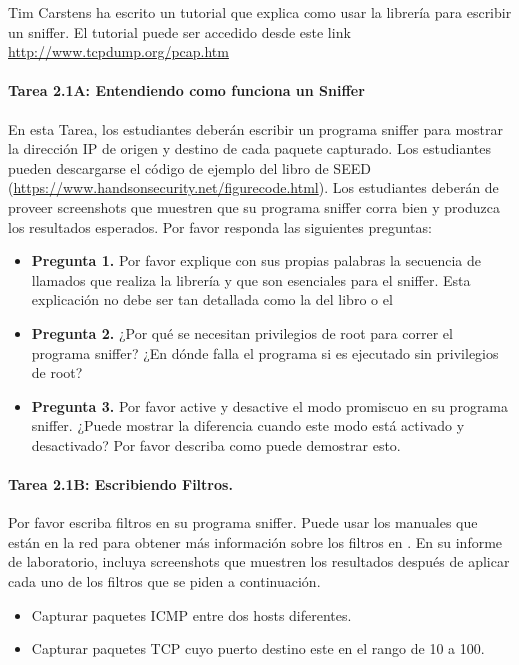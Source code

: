 Tim Carstens ha escrito un tutorial que explica como usar la librería \pcap para escribir un sniffer. El tutorial puede ser accedido desde este link \url{http://www.tcpdump.org/pcap.htm}
 

\paragraph{Tarea 2.1A: Entendiendo como funciona un Sniffer}
En esta Tarea, los estudiantes deberán escribir un programa sniffer para mostrar la dirección IP de origen y destino de cada paquete capturado. Los estudiantes pueden descargarse el código de ejemplo del libro de SEED (\url{https://www.handsonsecurity.net/figurecode.html}). 
Los estudiantes deberán de proveer screenshots que muestren que su programa sniffer corra bien y produzca los resultados esperados. Por favor responda las siguientes preguntas:


\begin{itemize}
\item \textbf{Pregunta 1.} Por favor explique con sus propias palabras la secuencia de llamados que realiza la librería y que son esenciales para el sniffer. Esta explicación no debe ser tan detallada como la del libro o el 

\item \textbf{Pregunta 2.} ¿Por qué se necesitan privilegios de root para correr el programa sniffer? ¿En dónde falla el programa si es ejecutado sin privilegios de root?

\item \textbf{Pregunta 3.} Por favor active y desactive el modo promiscuo en su programa sniffer. ¿Puede mostrar la diferencia cuando este modo está activado y desactivado? Por favor describa como puede demostrar esto.
\end{itemize}

\paragraph{Tarea 2.1B: Escribiendo Filtros.}
Por favor escriba filtros en su programa sniffer.
Puede usar los manuales que están en la red para obtener más información sobre los filtros en \pcap.
En su informe de laboratorio, incluya screenshots que muestren los resultados después de aplicar cada uno de los filtros que se piden a continuación.
\begin{itemize}
\item Capturar paquetes ICMP entre dos hosts diferentes.
\item Capturar paquetes TCP cuyo puerto destino este en el rango de 10 a 100.
\end{itemize}



